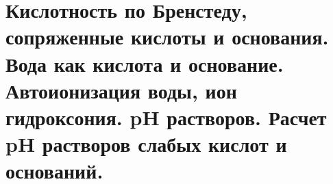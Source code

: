 \section{Кислотность по Бренстеду, сопряженные кислоты и основания. Вода как кислота и основание. Автоионизация воды, ион гидроксония. pH растворов. Расчет pH растворов слабых кислот и оснований.}

